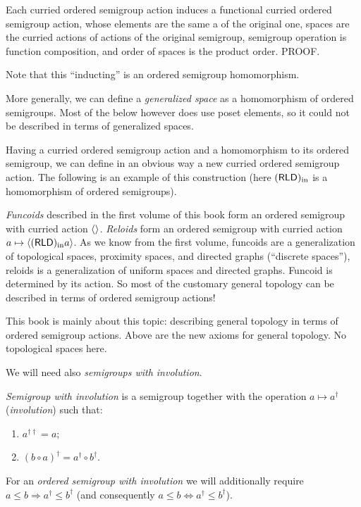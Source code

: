 Each curried ordered semigroup action induces a functional curried ordered semigroup action, whose elements are the same a of the original one, spaces are the curried actions of actions of the original semigroup, semigroup operation is function composition, and order of spaces is the product order. PROOF.

Note that this ``inducting'' is an ordered semigroup homomorphism.

More generally, we can define a \emph{generalized space} as a homomorphism of ordered semigroups. Most of the below however does use poset elements, so it could not be described in terms of generalized spaces.

Having a curried ordered semigroup action and a homomorphism to its ordered semigroup, we can define in an obvious way a new curried ordered semigroup action. The following is an example of this construction (here $(\mathsf{RLD})_{\mathrm{in}}$ is a homomorphism of ordered semigroups).

\emph{Funcoids} described in the first volume of this book form an ordered semigroup with curried action $\left\langle \right\rangle$. \emph{Reloids} form an ordered semigroup with curried action $a\mapsto\left\langle (\mathsf{RLD})_{\mathrm{in}} a\right\rangle$.
As we know from the first volume, funcoids are a generalization of topological spaces, proximity spaces, and directed graphs (``discrete spaces''), reloids is a generalization of uniform spaces and directed graphs. Funcoid is determined by its action. So most of the customary general topology can be described in terms of ordered semigroup actions!

This book is mainly about this topic: describing general topology in terms of ordered semigroup actions. Above are the new axioms for general topology. No topological spaces here.

We will need also \emph{semigroups with involution}.

\begin{defn}
\emph{Semigroup with involution} is a semigroup together with the operation $a\mapsto a^{\dagger}$ (\emph{involution}) such that:
\begin{enumerate}
\item $a^{\dagger\dagger} = a$;
\item $(b\circ a)^{\dagger} = a^{\dagger}\circ b^{\dagger}$.
\end{enumerate}
\end{defn}

For an \emph{ordered semigroup with involution} we will additionally require $a\leq b\Rightarrow a^{\dagger}\leq b^{\dagger}$ (and consequently $a\leq b\Leftrightarrow a^{\dagger}\leq b^{\dagger}$).

